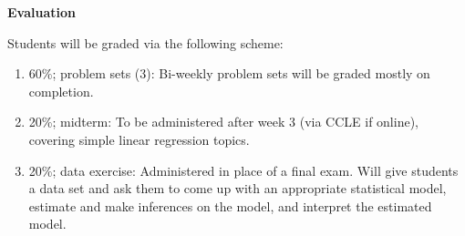 \documentclass[10pt]{article}
\theoremstyle{exampstyle}
\begin{document}
{\bf \large Evaluation}

Students will be graded via the following scheme:
\begin{enumerate}
  \item 60\%; problem sets (3): Bi-weekly problem sets will be graded mostly on completion.
  \item 20\%; midterm: To be administered after week 3 (via CCLE if online), covering simple linear regression topics.
  \item 20\%; data exercise: Administered in place of a final exam. Will give students a data set and ask them to come up with an appropriate statistical model, estimate and make inferences on the model, and interpret the estimated model.
\end{enumerate}
\end{document}

